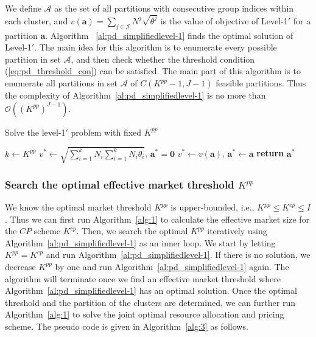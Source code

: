 \documentclass[twocolumn,10pt,twosided]{IEEEtran}
\begin{document}
We define $\mathcal{A}$ as the set of all partitions with consecutive group indices within each cluster, and  $v(\boldsymbol{a})=\sum_{j\in\mathcal{J}}N^j\sqrt{\theta^j}$ is the value of objective of Level-1$'$ for a partition $\boldsymbol{a}$. Algorithm ~\ref{al:pd_simplifiedlevel-1} finds the optimal solution of  Level-1$'$. The main idea for this algorithm is to enumerate every possible partition in set $\mathcal{A}$, and then check whether the threshold condition (\ref{eq:pd_threshold_con}) can be satisfied. The main part of this algorithm is to enumerate all partitions in set $\mathcal{A}$ of $C(K^{pp}-1, J-1)$ feasible partitions. Thus the
complexity of Algorithm~\ref{al:pd_simplifiedlevel-1} is no more than $\mathcal{O}((K^{pp})^{J-1})$.
\begin{algorithm}[htb]
\caption{Solve the level-1$'$ problem with fixed $K^{pp}$}
\label{al:pd_simplifiedlevel-1}
\begin{algorithmic}[1]
    \State $k\gets K^{pp}$
    \State $v^*\gets \sqrt{\sum_{i=1}^{k}N_i\sum_{i=1}^{k}N_i\theta_i}$, $\boldsymbol{a}^*=\boldsymbol{0}$ 
			 
					\State $v^*\gets v(\boldsymbol{a})$, $\boldsymbol{a}^*\gets\boldsymbol{a}$
				\EndIf
			\EndIf
    \EndFor
    \State \textbf{return} $\boldsymbol{a}^*$
    \EndFunction
\end{algorithmic}
\end{algorithm}




\subsubsection{Search the optimal effective market threshold  $K^{pp}$}
We know the optimal market threshold $K^{pp}$ is upper-bounded, i.e., $K^{pp}\le K^{cp}\le I$. Thus we can first run Algorithm~{\ref{alg:1}} to calculate the effective market size for the $CP$ scheme $K^{cp}$. Then, we search the optimal $K^{pp}$ iteratively  using Algorithm~\ref{al:pd_simplifiedlevel-1} as an inner loop. We start by letting  $K^{pp}=K^{cp}$ and run Algorithm~\ref{al:pd_simplifiedlevel-1}. If there is no solution, we decrease $K^{pp}$ by one and run Algorithm~\ref{al:pd_simplifiedlevel-1} again. The algorithm will terminate once we find an effective market threshold where Algorithm~\ref{al:pd_simplifiedlevel-1} has an optimal solution.
Once the optimal threshold and the partition of the clusters are determined, we can further run  Algorithm~{\ref{alg:1}} to solve the joint optimal resource allocation and pricing scheme. The pseudo code is given in Algorithm~\ref{alg:3} as follows.
\end{document}
